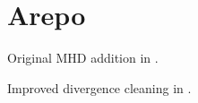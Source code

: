 \section{Arepo}

Original MHD addition in \cite{pakmor2011mhd}.

Improved divergence cleaning in \cite{pakmor2013cleaning}.
